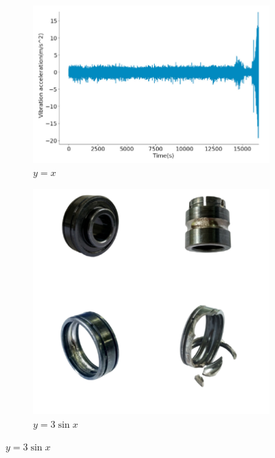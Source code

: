 \documentclass[xcolor=dvipsnames, professionalfonts, aspectratio=169, 11pt]{beamer}
\begin{document}
\begin{persian}
\begin{frame}
	\begin{figure}
		\centering
		\begin{subfigure}[b]{0.4\textwidth}
			\centering
			\includegraphics[width=\textwidth]{img/img1.png}
			\caption{$y=x$}
			\label{fig:y equals x}
		\end{subfigure}
		\hspace{0cm}
		\begin{subfigure}[b]{0.3\textwidth}
			\centering
			\includegraphics[width=\textwidth]{img/img2.png}
			\caption{$y=3\sin x$}
			\label{fig:three sin x}
		\end{subfigure}
		\hspace{0cm}
	\end{figure}
\end{frame}









\end{persian}
\end{document}
